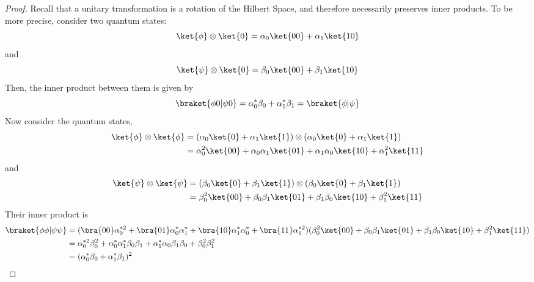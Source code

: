 \documentclass[12pt, oneside]{book}
\theoremstyle{definition}
\theoremstyle{definition}
\theoremstyle{remark}
\begin{document}
\begin{proof}
    Recall that a unitary transformation is a rotation of the Hilbert Space, and therefore necessarily preserves inner products. To be more precise, consider two quantum states: 
    \[
    \ket{\phi} \otimes \ket{0}= \alpha_0\ket{00}+\alpha_1\ket{10}
    \]
    and 
    \[\ket{\psi}\otimes \ket{0}=\beta_0\ket{00}+\beta_1\ket{10}
    \]
    Then, the inner product between them is given by 
    \[
    \braket{\phi0|\psi0}=\alpha^*_0\beta_0+\alpha^*_1\beta_1=\braket{\phi|\psi}
    \]
    Now consider the quantum states, 
    \begin{align*}
    \ket{\phi} \otimes \ket{\phi}&=(\alpha_0\ket{0}+\alpha_1\ket{1})\otimes (\alpha_0\ket{0}+\alpha_1\ket{1})\\
    &=\alpha^2_0\ket{00}+\alpha_0\alpha_1\ket{01}+\alpha_1\alpha_0\ket{10}+\alpha^2_1\ket{11}
    \end{align*}
    and
    \begin{align*}
    \ket{\psi}\otimes \ket{\psi}&=(\beta_0\ket{0}+\beta_1\ket{1})\otimes (\beta_0\ket{0}+\beta_1\ket{1})\\
    &=\beta^2_0\ket{00}+\beta_0\beta_1\ket{01}+\beta_1\beta_0\ket{10}+\beta^2_1\ket{11}
    \end{align*}
    Their inner product is 
    \begin{align*}
    \braket{\phi\phi|\psi\psi}&=(\bra{00}\alpha^{*2}_0+\bra{01}\alpha^*_0\alpha^*_1+\bra{10}\alpha^*_1\alpha^*_0+\bra{11}\alpha^{*2}_1)(\beta^2_0\ket{00}+\beta_0\beta_1\ket{01}+\beta_1\beta_0\ket{10}+\beta^2_1\ket{11})\\
    &=\alpha^{*2}_0\beta^2_0+\alpha^*_0\alpha^*_1\beta_0\beta_1+\alpha^*_1\alpha_0\beta_1\beta_0+\beta^2_0\beta^2_1\\
    &=(\alpha^*_0\beta_0+\alpha^*_1\beta_1)^2
    \end{align*}


\end{proof}
\end{document}
